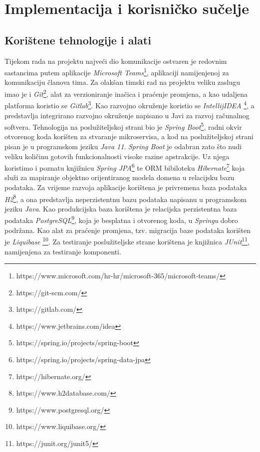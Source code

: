\chapter{Implementacija i korisničko sučelje}
		
		
		\section{Korištene tehnologije i alati}
		
			 Tijekom rada na projektu najveći dio komunikacije ostvaren je redovnim sastancima putem aplikacije \textit{Microsoft Teams}\footnote{https://www.microsoft.com/hr-hr/microsoft-365/microsoft-teams/}, aplikaciji namijenjenoj za komunikaciju članova tima. Za olakšan timski rad na projektu veliku zaslugu imao je i \textit{Git}\footnote{https://git-scm.com/}, alat za verzioniranje inačica i praćenje promjena, a kao udaljena platforma koristio se \textit{Gitlab}\footnote{https://gitlab.com/}.\newline
			  Kao razvojno okruženje koristio se \textit{IntellijIDEA} \footnote{https://www.jetbrains.com/idea}, a predstavlja integrirano razvojno okruženje napisano u Javi za razvoj računalnog softvera. Tehnologija na poslužiteljskoj strani bio je \textit{Spring Boot}\footnote{https://spring.io/projects/spring-boot}, radni okvir otvorenog koda korišten za stvaranje mikroservisa, a kod na poslužiteljskoj strani pisan je u programskom jeziku \textit{Java 11}. \textit{Spring Boot} je odabran zato što nudi veliku količinu gotovih funkcionalnosti visoke razine apstrakcije. Uz njega koristimo i poznatu knjižnicu \textit{Spring JPA}\footnote{https://spring.io/projects/spring-data-jpa} te ORM bibiloteku \textit{Hibernate}\footnote{https://hibernate.org/} koja služi za mapiranje objektno orijentiranog modela domena u relacijsku bazu podataka. Za vrijeme razvoja aplikacije korištena je privremena baza podataka \textit{H2}\footnote{https://www.h2database.com/}, a ona predstavlja neperzistentnu bazu podataka napisanu u programskom jeziku \textit{Java}. Kao produkcijska baza korištena je relacijska perzistentna baza podataka \textit{PostgreSQL}\footnote{https://www.postgresql.org/}, koja je besplatna i otvorenog koda, u \textit{Springu} dobro podržana. Kao alat za praćenje promjena, tzv. migracija baze podataka korišten je \textit{Liquibase} \footnote{https://www.liquibase.org/}. Za testiranje poslužiteljske strane korištena je knjižnica \textit{JUnit}\footnote{https://junit.org/junit5/}, namijenjena za testiranje komponenti.
